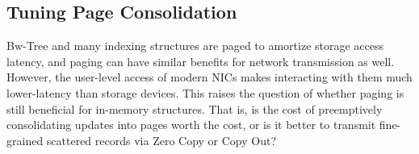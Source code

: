 
\subsection{Tuning Page Consolidation}
\label{sec:consolidation}


Bw-Tree and many indexing structures are paged to amortize storage
access latency, and paging can have similar benefits for network transmission
as well. However, the user-level access of modern NICs makes interacting with
them much lower-latency than storage devices. This raises the question of
whether paging is still beneficial for in-memory structures. That is, is the
cost of preemptively consolidating updates into pages worth the cost, or is it
better to transmit fine-grained scattered records via Zero Copy or Copy Out?

%



